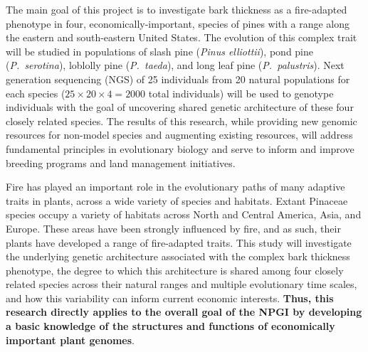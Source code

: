 


The main goal of this project is to investigate bark thickness as a fire-adapted phenotype in four, economically-important, 
species of pines with a range along the eastern and south-eastern United States.  The evolution of this complex trait will 
be studied in populations of slash pine (\textit{Pinus elliottii}), pond pine (\textit{P.\ serotina}), loblolly pine (\textit{P.\ taeda}), 
and long leaf pine (\textit{P.\ palustris}).  Next generation sequencing (NGS) of 25 individuals from 20 natural populations for each 
species ($25 \times 20 \times 4 = 2000$ total individuals) will be used to genotype individuals with the goal of uncovering shared 
genetic architecture of these four closely related species. The results of this research, while providing new genomic 
resources for non-model species and augmenting existing resources, will address fundamental principles in 
evolutionary biology and serve to inform and improve breeding programs and land management initiatives.

Fire has played an important role in the evolutionary paths of many adaptive traits in plants, across a wide variety of species 
and habitats.  Extant Pinaceae species occupy a variety of habitats across North and Central America, Asia, and Europe.  
These areas have been strongly influenced by fire, and as such, their plants have developed a range 
of fire-adapted traits.  This study will investigate the underlying genetic architecture associated with the complex 
bark thickness phenotype, the degree to which this architecture is shared among four closely related species across their natural 
ranges and multiple evolutionary time scales, and how this variability can inform current economic interests.  \textbf{Thus, this research 
directly applies to the overall goal of the NPGI by developing a basic knowledge of the structures and functions of economically 
important plant genomes}.


